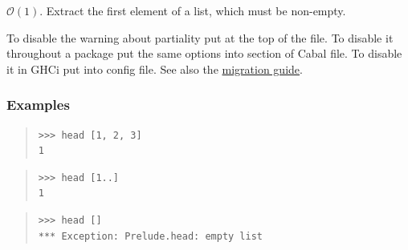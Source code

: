\begin{haddockdesc}
\item[\begin{tabular}{@{}l}
head :: HasCallStack => {\char 91}a{\char 93} -> a
\end{tabular}]
{\haddockbegindoc
\(\mathcal{O}(1)\). Extract the first element of a list, which must be non-empty.\par
To disable the warning about partiality put 
 at the top of the file. To disable it throughout a package put the same
 options into  section of Cabal file. To disable it in GHCi
 put  into  config file.
 See also the \href{https://github.com/haskell/core-libraries-committee/blob/main/guides/warning-for-head-and-tail.md}{migration guide}.\par
\subsubsection*{\textbf{Examples}}
\begin{quote}
{\haddockverb\begin{verbatim}
>>> head [1, 2, 3]
1

\end{verbatim}}
\end{quote}
\begin{quote}
{\haddockverb\begin{verbatim}
>>> head [1..]
1

\end{verbatim}}
\end{quote}
\begin{quote}
{\haddockverb\begin{verbatim}
>>> head []
*** Exception: Prelude.head: empty list

\end{verbatim}}
\end{quote}}
\end{haddockdesc}
